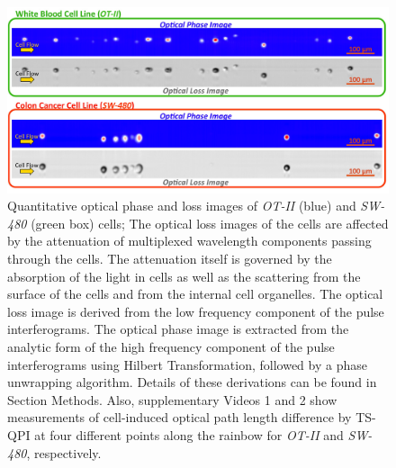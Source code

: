 \documentclass[aps,pra,reprint,superscriptaddress]{revtex4-1}
\begin{document}
\begin{figure}
\end{figure}

\begin{figure}
\includegraphics[scale=0.2]{Figure2DImage.jpg}
\caption{\label{fig:2DImage} Quantitative optical phase and loss images of \textit{OT-II} (blue) and \textit{SW-480} (green box) cells; The optical loss images of the cells are affected by the attenuation of multiplexed wavelength components passing through the cells. The attenuation itself is governed by the absorption of the light in cells as well as the scattering from the surface of the cells and from the internal cell organelles. The optical loss image is derived from the low frequency component of the pulse interferograms. The optical phase image is extracted from the analytic form of the high frequency component of the pulse interferograms using Hilbert Transformation, followed by a phase unwrapping algorithm. Details of these derivations can be found in Section Methods. Also, supplementary Videos 1 and 2 show measurements of cell-induced optical path length difference by TS-QPI at four different points along the rainbow for \textit{OT-II} and \textit{SW-480}, respectively.}
\end{figure}
\end{document}
